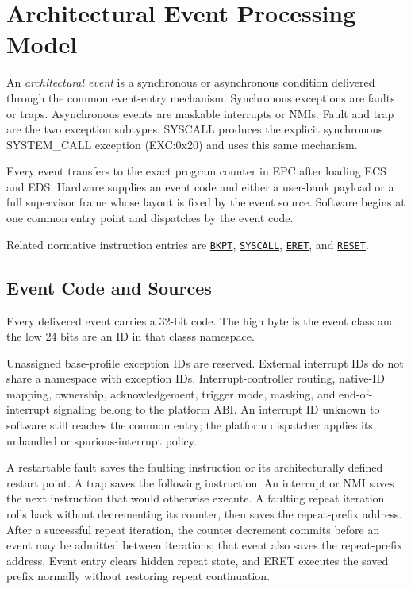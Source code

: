 \clearpage
\section{Architectural Event Processing Model}\label{page:architectural-event-processing-model}

An \emph{architectural event} is a synchronous or asynchronous condition delivered through the common event-entry
mechanism. Synchronous exceptions are faults or traps. Asynchronous events are maskable interrupts or NMIs. Fault
and trap are the two exception subtypes. SYSCALL produces the explicit synchronous
SYSTEM\_CALL exception (EXC:0x20) and uses this same mechanism.

Every event transfers to the exact program counter in EPC after loading ECS and EDS. Hardware supplies an event code
and either a user-bank payload or a full supervisor frame whose layout is fixed by the event source. Software begins at one
common entry point and dispatches by the event code.

Related normative instruction entries are
\hyperref[instr:bkpt]{\texttt{BKPT}},
\hyperref[instr:syscall]{\texttt{SYSCALL}},
\hyperref[instr:eret]{\texttt{ERET}}, and
\hyperref[instr:reset]{\texttt{RESET}}.\par

\subsection{Event Code and Sources}\label{section:event-code-and-sources}
Every delivered event carries a 32-bit code. The high byte is the event class and the low 24 bits are an ID in that
class\textquotesingle{}s namespace.





Unassigned base-profile exception IDs are reserved. External interrupt IDs do not share a namespace with exception
IDs. Interrupt-controller routing,
native-ID mapping, ownership, acknowledgement, trigger mode, masking, and end-of-interrupt signaling belong to the
platform ABI. An interrupt ID unknown to software still reaches the common entry;
the platform dispatcher applies its unhandled or spurious-interrupt policy.

A restartable fault saves the faulting instruction or its architecturally defined restart point. A trap saves the
following instruction. An interrupt or NMI saves the next instruction that would otherwise execute. A faulting repeat
iteration rolls back without decrementing its counter, then saves the repeat-prefix address. After a successful repeat
iteration, the counter decrement commits before an event may be admitted between iterations; that event also saves
the repeat-prefix address. Event entry clears hidden repeat state, and ERET executes the saved prefix normally without
restoring repeat continuation.

